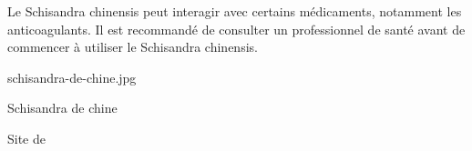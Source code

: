 {%
  Le Schisandra chinensis peut interagir avec certains médicaments, notamment les anticoagulants. Il est recommandé de consulter un professionnel de santé avant de commencer à utiliser le Schisandra chinensis.
 }

{%
    schisandra-de-chine.jpg
}

{%
    Schisandra de chine
}

{%
   Site de 
}